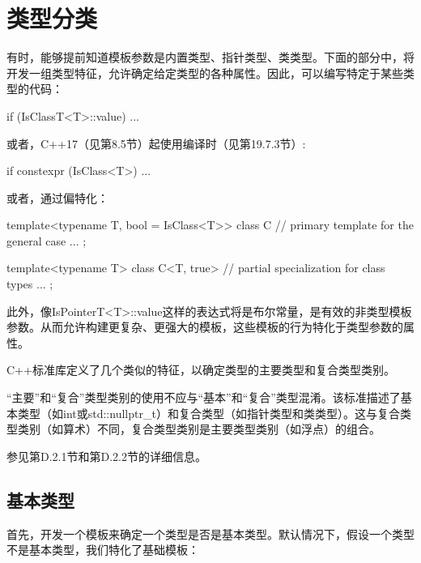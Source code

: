 \section{类型分类}

有时，能够提前知道模板参数是内置类型、指针类型、类类型。下面的部分中，将开发一组类型特征，允许确定给定类型的各种属性。因此，可以编写特定于某些类型的代码：

\begin{cpp}
if (IsClassT<T>::value) {
	...
}
\end{cpp}

或者，C++17（见第8.5节）起使用编译时（见第19.7.3节）:

\begin{cpp}
if constexpr (IsClass<T>) {
	...
}
\end{cpp}

或者，通过偏特化：

\begin{cpp}
template<typename T, bool = IsClass<T>>
class C { // primary template for the general case
	...
};

template<typename T>
class C<T, true> { // partial specialization for class types
	...
};
\end{cpp}

此外，像IsPointerT<T>::value这样的表达式将是布尔常量，是有效的非类型模板参数。从而允许构建更复杂、更强大的模板，这些模板的行为特化于类型参数的属性。

C++标准库定义了几个类似的特征，以确定类型的主要类型和复合类型类别。

\begin{notice}
“主要”和“复合”类型类别的使用不应与“基本”和“复合”类型混淆。该标准描述了基本类型（如int或std::nullptr\_t）和复合类型（如指针类型和类类型）。这与复合类型类别（如算术）不同，复合类型类别是主要类型类别（如浮点）的组合。
\end{notice}

参见第D.2.1节和第D.2.2节的详细信息。

\subsection{基本类型}

首先，开发一个模板来确定一个类型是否是基本类型。默认情况下，假设一个类型不是基本类型，我们特化了基础模板：

